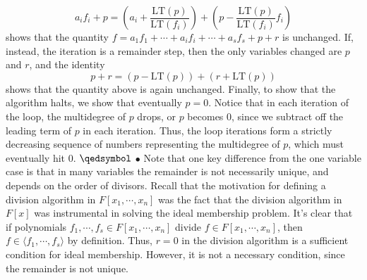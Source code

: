 \documentclass{article}
\begin{document}
$$ a_i f_i + p = \left( a_i + \frac{\text{LT}(p)}{\text{LT}(f_i)} \right) + \left( p - \frac{\text{LT}(p)}{\text{LT}(f_i)} f_i \right) $$
shows that the quantity $ f = a_1 f_1 + \cdots + a_i f_i + \cdots + a_s f_s + p + r $ is unchanged. If, instead, the iteration is a remainder step, then the only variables changed are $ p $ and $ r $, and the identity
$$ p + r = \left( p - \text{LT}(p) \right) + \left( r + \text{LT}(p) \right) $$
shows that the quantity above is again unchanged.
\newline
Finally, to show that the algorithm halts, we show that eventually $ p = 0 $. Notice that in each iteration of the loop, the multidegree of $ p $ drops, or $ p $ becomes 0, since we subtract off the leading term of $ p $ in each iteration. Thus, the loop iterations form a strictly decreasing sequence of numbers representing the multidegree of $ p $, which must eventually hit 0. $ \qedsymbol $
\newline
\indent $ \bullet $ Note that one key difference from the one variable case is that in many variables the remainder is not necessarily unique, and depends on the order of divisors.
\newline \newline
Recall that the motivation for defining a division algorithm in $ F[x_1, \cdots, x_n] $ was the fact that the division algorithm in $ F[x] $ was instrumental in solving the ideal membership problem. It's clear that if polynomials $ f_1, \cdots, f_s \in F[x_1, \cdots, x_n] $ divide $ f \in F[x_1, \cdots, x_n] $, then $ f \in \langle f_1, \cdots, f_s \rangle $ by definition. Thus, $ r = 0 $ in the division algorithm is a sufficient condition for ideal membership. However, it is not a necessary condition, since the remainder is not unique.
\end{document}
